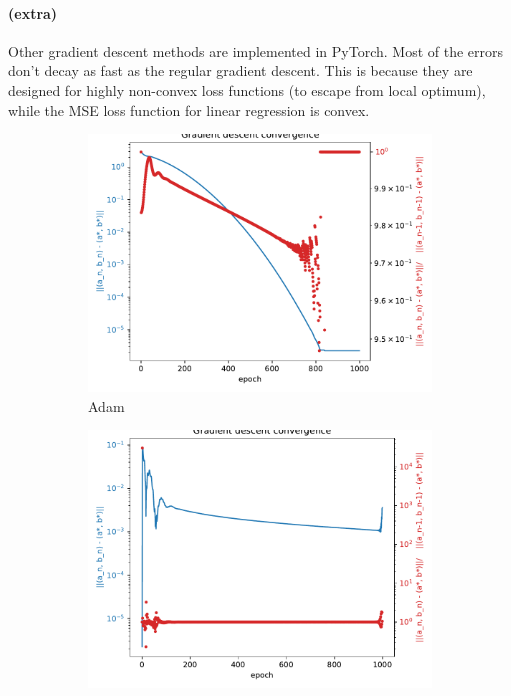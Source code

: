 \documentclass[12pt]{article}
\begin{document}
\paragraph{(extra)}
Other gradient descent methods are implemented in PyTorch.
Most of the errors don't decay as fast as the regular gradient descent.
This is because they are designed for highly non-convex loss functions (to escape from local optimum), while the MSE loss function for linear regression is convex.
\begin{figure}[htbp]
    \centering
    \begin{subfigure}[t]{0.48\textwidth}
        \centering
        \includegraphics[width=\textwidth]{Homework1/ex2x1.pdf}
        \caption{Adam}
    \end{subfigure}
    \begin{subfigure}[t]{0.48\textwidth}
        \centering
        \includegraphics[width=\textwidth]{Homework1/ex2x2.pdf}

\end{subfigure}
\end{figure}
\end{document}
